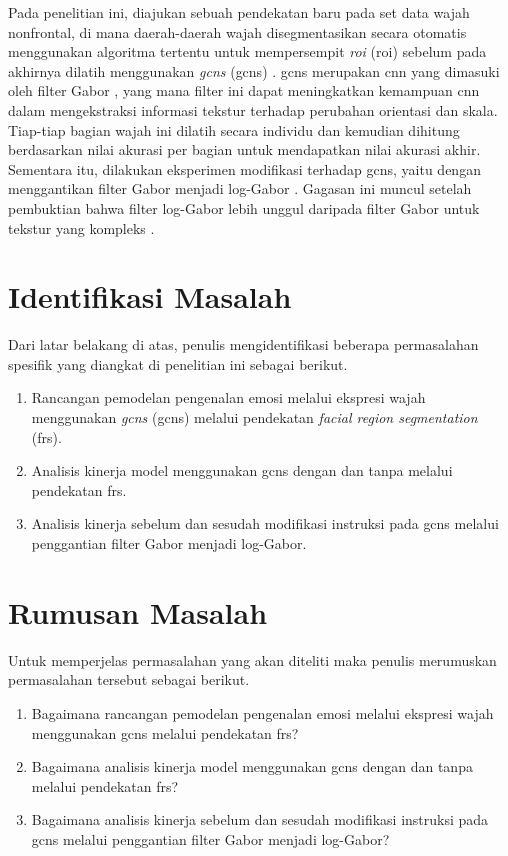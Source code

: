 Pada penelitian ini, diajukan sebuah pendekatan baru pada set data wajah nonfrontal, di mana daerah-daerah wajah disegmentasikan secara otomatis menggunakan algoritma tertentu untuk mempersempit \textit{\acrlong{roi}} (\acrshort{roi}) sebelum pada akhirnya dilatih menggunakan \textit{\acrlong{gcns}} (\acrshort{gcns}) . \acrshort{gcns} merupakan \acrshort{cnn} yang dimasuki oleh filter Gabor , yang mana filter ini dapat meningkatkan kemampuan \acrshort{cnn} dalam mengekstraksi informasi tekstur terhadap perubahan orientasi dan skala. Tiap-tiap bagian wajah ini dilatih secara individu dan kemudian dihitung berdasarkan nilai akurasi per bagian untuk mendapatkan nilai akurasi akhir. Sementara itu, dilakukan eksperimen modifikasi terhadap \acrshort{gcns}, yaitu dengan menggantikan filter Gabor menjadi log-Gabor . Gagasan ini muncul setelah pembuktian bahwa filter log-Gabor lebih unggul daripada filter Gabor untuk tekstur yang kompleks . %

\section{Identifikasi Masalah}
Dari latar belakang di atas, penulis mengidentifikasi beberapa permasalahan spesifik yang diangkat di penelitian ini sebagai berikut.
\begin{enumerate}
    \item Rancangan pemodelan pengenalan emosi melalui ekspresi wajah menggunakan \textit{\acrlong{gcns}} (\acrshort{gcns}) melalui pendekatan \textit{facial region segmentation} (\acrshort{frs}).
    \item Analisis kinerja model menggunakan \acrshort{gcns} dengan dan tanpa melalui pendekatan \acrshort{frs}.
    \item Analisis kinerja sebelum dan sesudah modifikasi instruksi pada \acrshort{gcns} melalui penggantian filter Gabor menjadi log-Gabor.
\end{enumerate}

\section{Rumusan Masalah}
Untuk memperjelas permasalahan yang akan diteliti maka penulis merumuskan permasalahan tersebut sebagai berikut.
\begin{enumerate}
    \item Bagaimana rancangan pemodelan pengenalan emosi melalui ekspresi wajah menggunakan \acrshort{gcns} melalui pendekatan \acrshort{frs}?
    \item Bagaimana analisis kinerja model menggunakan \acrshort{gcns} dengan dan tanpa melalui pendekatan \acrshort{frs}?
    \item Bagaimana analisis kinerja sebelum dan sesudah modifikasi instruksi pada \acrshort{gcns} melalui penggantian filter Gabor menjadi log-Gabor?
\end{enumerate}

